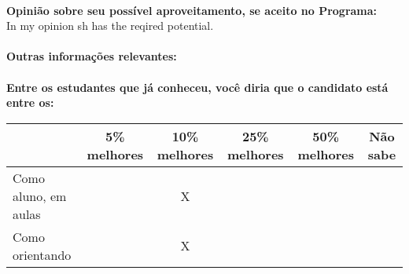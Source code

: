 \documentclass[11pt]{article}
\begin{document}
\\
\textbf{Opinião sobre seu possível aproveitamento, se aceito no Programa:}
\\In my opinion sh has the reqired potential.\\ 
\\
\textbf{Outras informações relevantes:} \\
\\[0.3cm]
\textbf{Entre os estudantes que já conheceu, você diria que o candidato está entre os:}
\\
\begin{tabular}{|l|c|c|c|c|c|}
\hline
 & 5\% melhores & 10\% melhores & 25\% melhores & 50\% melhores & Não sabe \\
\hline
Como aluno, em aulas &  & X &  &  & \\
\hline
Como orientando &  & X &  &  & \\
\hline
\end{tabular}
\end{document}
